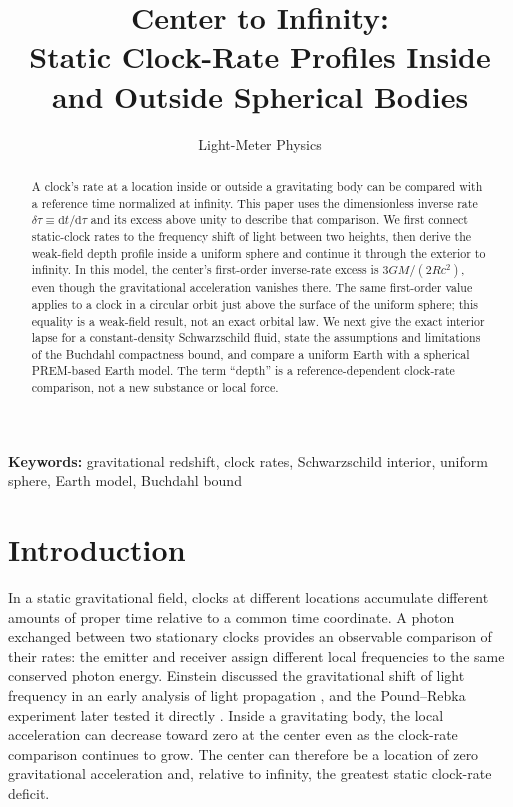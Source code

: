 \documentclass[12pt]{article}
\title{Center to Infinity:\\
Static Clock-Rate Profiles Inside and Outside Spherical Bodies}
\author{Light-Meter Physics}
\date{}
\begin{document}
\maketitle

\begin{abstract}
A clock's rate at a location inside or outside a gravitating body can be compared with a reference time normalized at infinity. This paper uses the dimensionless inverse rate $\delta\tau\equiv\mathrm{d}t/\mathrm{d}\tau$ and its excess above unity to describe that comparison. We first connect static-clock rates to the frequency shift of light between two heights, then derive the weak-field depth profile inside a uniform sphere and continue it through the exterior to infinity. In this model, the center's first-order inverse-rate excess is $3GM/(2Rc^2)$, even though the gravitational acceleration vanishes there. The same first-order value applies to a clock in a circular orbit just above the surface of the uniform sphere; this equality is a weak-field result, not an exact orbital law. We next give the exact interior lapse for a constant-density Schwarzschild fluid, state the assumptions and limitations of the Buchdahl compactness bound, and compare a uniform Earth with a spherical PREM-based Earth model. The term ``depth'' is a reference-dependent clock-rate comparison, not a new substance or local force.
\end{abstract}

\noindent\textbf{Keywords:} gravitational redshift, clock rates, Schwarzschild interior, uniform sphere, Earth model, Buchdahl bound

\section{Introduction}

In a static gravitational field, clocks at different locations accumulate different amounts of proper time relative to a common time coordinate. A photon exchanged between two stationary clocks provides an observable comparison of their rates: the emitter and receiver assign different local frequencies to the same conserved photon energy. Einstein discussed the gravitational shift of light frequency in an early analysis of light propagation \cite{Einstein1911}, and the Pound--Rebka experiment later tested it directly \cite{PoundRebka}. Inside a gravitating body, the local acceleration can decrease toward zero at the center even as the clock-rate comparison continues to grow. The center can therefore be a location of zero gravitational acceleration and, relative to infinity, the greatest static clock-rate deficit.
\end{document}
